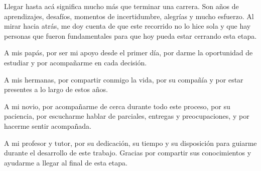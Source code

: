 
Llegar hasta acá significa mucho más que terminar una carrera. Son años de aprendizajes, desafíos, momentos de incertidumbre, alegrías y mucho esfuerzo. Al mirar hacia atrás, me doy cuenta de que este recorrido no lo hice sola y que hay personas que fueron fundamentales para que hoy pueda estar cerrando esta etapa.

A mis papás, por ser mi apoyo desde el primer día, por darme la oportunidad de estudiar y por acompañarme en cada decisión.

A mis hermanas, por compartir conmigo la vida, por su compañía y por estar presentes a lo largo de estos años.

A mi novio, por acompañarme de cerca durante todo este proceso, por su paciencia, por escucharme hablar de parciales, entregas y preocupaciones, y por hacerme sentir acompañada.

A mi profesor y tutor, por su dedicación, su tiempo y su disposición para guiarme durante el desarrollo de este trabajo. Gracias por compartir sus conocimientos y ayudarme a llegar al final de esta etapa.
